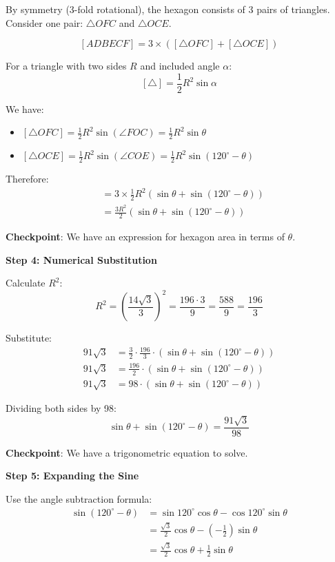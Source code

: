 \documentclass[12pt]{article}
\begin{document}
\begin{solutionbox}
By symmetry (3-fold rotational), the hexagon consists of 3 pairs of triangles. Consider one pair: $\triangle OFC$ and $\triangle OCE$.

$$[ADBECF] = 3 \times ([\triangle OFC] + [\triangle OCE])$$

For a triangle with two sides $R$ and included angle $\alpha$:
$$[\triangle] = \frac{1}{2}R^2\sin\alpha$$

We have:
\begin{itemize}
    \item $[\triangle OFC] = \frac{1}{2}R^2\sin(\angle FOC) = \frac{1}{2}R^2\sin\theta$
    \item $[\triangle OCE] = \frac{1}{2}R^2\sin(\angle COE) = \frac{1}{2}R^2\sin(120^{\circ} - \theta)$
\end{itemize}

Therefore:
\begin{align*}
    [ADBECF] &= 3 \times \frac{1}{2}R^2(\sin\theta + \sin(120^{\circ} - \theta)) \\
    &= \frac{3R^2}{2}(\sin\theta + \sin(120^{\circ} - \theta))
\end{align*}

\textbf{Checkpoint}: We have an expression for hexagon area in terms of $\theta$.

\vspace{0.3cm}

\textbf{Step 4: Numerical Substitution}

Calculate $R^2$:
$$R^2 = \left(\frac{14\sqrt{3}}{3}\right)^2 = \frac{196 \cdot 3}{9} = \frac{588}{9} = \frac{196}{3}$$

Substitute:
\begin{align*}
    91\sqrt{3} &= \frac{3}{2} \cdot \frac{196}{3} \cdot (\sin\theta + \sin(120^{\circ} - \theta)) \\
    91\sqrt{3} &= \frac{196}{2} \cdot (\sin\theta + \sin(120^{\circ} - \theta)) \\
    91\sqrt{3} &= 98 \cdot (\sin\theta + \sin(120^{\circ} - \theta))
\end{align*}

Dividing both sides by 98:
$$\sin\theta + \sin(120^{\circ} - \theta) = \frac{91\sqrt{3}}{98}$$

\textbf{Checkpoint}: We have a trigonometric equation to solve.

\vspace{0.3cm}

\textbf{Step 5: Expanding the Sine}

Use the angle subtraction formula:
\begin{align*}
    \sin(120^{\circ} - \theta) &= \sin 120^{\circ} \cos\theta - \cos 120^{\circ} \sin\theta \\
    &= \frac{\sqrt{3}}{2}\cos\theta - \left(-\frac{1}{2}\right)\sin\theta \\
    &= \frac{\sqrt{3}}{2}\cos\theta + \frac{1}{2}\sin\theta
\end{align*}


\end{solutionbox}
\end{document}
